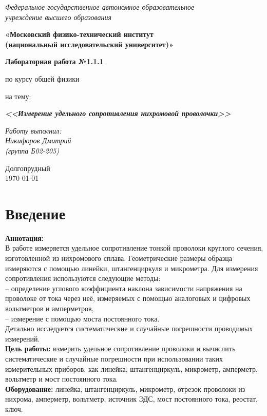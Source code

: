 \documentclass[a4paper, 12pt]{article}
\begin{document}
	\begin{center}
		\textit{Федеральное государственное автономное образовательное\\ учреждение высшего образования }
		
		\vspace{0.5ex}
		
		\textbf{«Московский физико-технический институт\\ (национальный исследовательский университет)»}
	\end{center}
	
	\vspace{10ex}
	
	
	\begin{center}
		\vspace{13ex}
		
		\textbf{Лабораторная работа №1.1.1}
		
		\vspace{1ex}
		
		по курсу общей физики
		
		на тему:
		
		\textbf{\textit{<<Измерение удельного сопротивления нихромовой проволочки>>}}
		
		\vspace{30ex}
		
		\begin{flushright}
			\noindent
			\textit{Работу выполнил:}\\  
			\textit{Никифоров Дмитрий \\(группа Б02-205)}
		\end{flushright}
		\vfill
		Долгопрудный \\ \today
		
	\end{center}
\newpage


\section{Введение}
\textbf{Аннотация:}
\\
В работе измеряется удельное сопротивление тонкой проволоки круглого сечения, изготовленной из нихромового сплава. Геометрические размеры образца измеряются с помощью линейки, штангенциркуля и микрометра. Для измерения сопротивления используются следующие методы: 
\\
-- определение углового коэффициента наклона зависимости напряжения на проволоке от тока через неё, измеряемых с помощью аналоговых и цифровых вольтметров и амперметров, 
\\
-- измерение с помощью моста постоянного тока. 
\\Детально исследуется систематические и случайные погрешности проводимых измерений.
\bigskip\\
\textbf{Цель работы:} измерить удельное сопротивление проволоки и вычислить систематические и случайные погрешности при использовании таких измерительных приборов, как линейка, штангенциркуль, микрометр, амперметр, вольтметр и мост постоянного тока.
\bigskip\\
\textbf{Оборудование:} линейка, штангенциркуль, микрометр, отрезок проволоки из нихрома, амперметр, вольтметр, источник ЭДС, мост постоянного тока, реостат, ключ.
\end{document}

